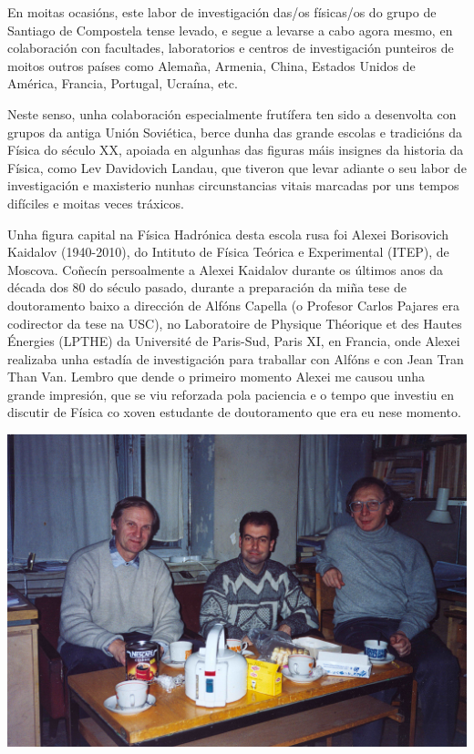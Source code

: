\begin{refsection}
\begin{multicols}{2}
En moitas ocasións, este labor de investigación das/os físicas/os do grupo de Santiago de Compostela tense levado, e segue a levarse a cabo agora mesmo, en colaboración con facultades, laboratorios e centros de investigación punteiros de moitos outros países como Alemaña, Armenia, China, Estados Unidos de América, Francia, Portugal, Ucraína, etc.

Neste senso, unha colaboración especialmente frutífera ten sido a desenvolta con grupos da antiga Unión Soviética, berce dunha das grande escolas e tradicións da Física do século XX, apoiada en algunhas das figuras máis insignes da historia da Física, como Lev Davidovich Landau, que tiveron que levar adiante o seu labor de investigación e maxisterio nunhas circunstancias vitais marcadas por uns tempos difíciles e moitas veces tráxicos.

Unha figura capital na Física Hadrónica desta escola rusa foi Alexei Borisovich Kaidalov (1940-2010), do Intituto de Física Teórica e Experimental (ITEP), de Moscova. Coñecín persoalmente a Alexei Kaidalov durante os últimos anos da década dos 80 do século pasado, durante a preparación da miña tese de doutoramento baixo a dirección de Alfóns Capella (o Profesor Carlos Pajares era codirector da tese na USC), no Laboratoire de Physique Théorique  et des Hautes Énergies (LPTHE) da Université de Paris-Sud, Paris XI, en Francia, onde Alexei realizaba unha estadía de investigación para traballar con Alfóns e con Jean Tran Than Van. Lembro que dende o primeiro momento Alexei me causou unha grande impresión, que se viu reforzada pola paciencia e o tempo que investiu en discutir de Física co xoven estudante de doutoramento que era eu nese momento.

\begin{center}
    \includegraphics[width=0.9\linewidth]{revistas/002/imaxes/Kaidalov_Picture.jpg}
\end{center}    


\end{multicols}
\end{refsection}

